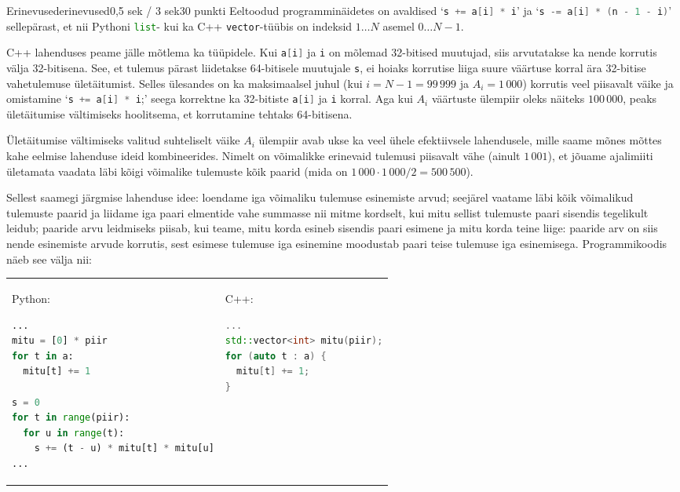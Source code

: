 \begin{yl}{3}{Erinevused}{erinevused}{0,5 sek / 3 sek}{30 punkti}
Eeltoodud programminäidetes on avaldised `\lstinline[language=C++]|s += a[i] * i|' ja `\lstinline[language=C++]|s -= a[i] * (n - 1 - i)|' sellepärast, et nii Pythoni \lstinline[language=Python]|list|- kui ka C++ \lstinline[language=C++]|vector|-tüübis on indeksid $1 \ldots N$ asemel $0 \ldots N-1$.

C++ lahenduses peame jälle mõtlema ka tüüpidele. Kui \lstinline[language=C++]|a[i]| ja \lstinline[language=C++]|i| on mõlemad 32-bitised muutujad, siis arvutatakse ka nende korrutis välja 32-bitisena. See, et tulemus pärast liidetakse 64-bitisele muutujale \lstinline[language=C++]|s|, ei hoiaks korrutise liiga suure väärtuse korral ära 32-bitise vahetulemuse ületäitumist. Selles ülesandes on ka maksimaalsel juhul (kui $i = N-1 = 99\,999$ ja $A_i = 1\,000$) korrutis veel piisavalt väike ja omistamine `\lstinline[language=C++]|s += a[i] * i|;' seega korrektne ka 32-bitiste \lstinline[language=C++]|a[i]| ja \lstinline[language=C++]|i| korral. Aga kui $A_i$ väärtuste ülempiir oleks näiteks $100\,000$, peaks ületäitumise vältimiseks hoolitsema, et korrutamine tehtaks 64-bitisena.

Ületäitumise vältimiseks valitud suhteliselt väike $A_i$ ülempiir avab ukse ka veel ühele efektiivsele lahendusele, mille saame mõnes mõttes kahe eelmise lahenduse ideid kombineerides. Nimelt on võimalikke erinevaid tulemusi piisavalt vähe (ainult $1\,001$), et jõuame ajalimiiti ületamata vaadata läbi kõigi võimalike tulemuste kõik paarid (mida on $1\,000 \cdot 1\,000 / 2 = 500\,500$).

Sellest saamegi järgmise lahenduse idee: loendame iga võimaliku tulemuse esinemiste arvud; seejärel vaatame läbi kõik võimalikud tulemuste paarid ja liidame iga paari elmentide vahe summasse nii mitme kordselt, kui mitu sellist tulemuste paari sisendis tegelikult leidub; paaride arvu leidmiseks piisab, kui teame, mitu korda esineb sisendis paari esimene ja mitu korda teine liige: paaride arv on siis nende esinemiste arvude korrutis, sest esimese tulemuse iga esinemine moodustab paari teise tulemuse iga esinemisega. Programmikoodis näeb see välja nii:

\begin{tabular}{p{\colwidth} p{\colwidth}}
Python:
\begin{lstlisting}[language=Python]
...
mitu = [0] * piir
for t in a:
  mitu[t] += 1

s = 0
for t in range(piir):
  for u in range(t):
    s += (t - u) * mitu[t] * mitu[u]
...
\end{lstlisting}
&
C++:
\begin{lstlisting}[language=C++]
...
std::vector<int> mitu(piir);
for (auto t : a) {
  mitu[t] += 1;
}


\end{lstlisting}
\end{tabular}
\end{yl}
